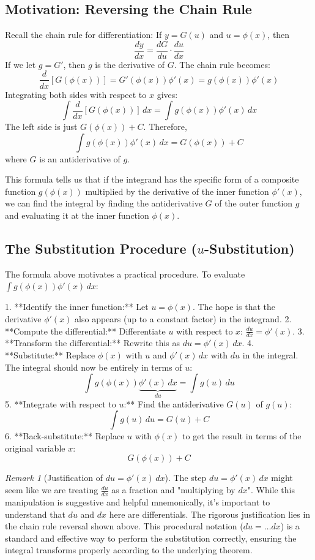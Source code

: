 \documentclass[11pt]{article}
\theoremstyle{definition}
\theoremstyle{remark}
\newtheorem{remark}[theorem]{Remark}
\begin{document}
\subsection{Motivation: Reversing the Chain Rule}
Recall the chain rule for differentiation: If $y = G(u)$ and $u = \phi(x)$, then
\[ \frac{dy}{dx} = \frac{dG}{du} \cdot \frac{du}{dx} \]
If we let $g = G'$, then $g$ is the derivative of $G$. The chain rule becomes:
\[ \frac{d}{dx} [G(\phi(x))] = G'(\phi(x)) \phi'(x) = g(\phi(x)) \phi'(x) \]
Integrating both sides with respect to $x$ gives:
\[ \int \frac{d}{dx} [G(\phi(x))] \, dx = \int g(\phi(x)) \phi'(x) \, dx \]
The left side is just $G(\phi(x)) + C$. Therefore,
\[ \int g(\phi(x)) \phi'(x) \, dx = G(\phi(x)) + C \]
where $G$ is an antiderivative of $g$.

This formula tells us that if the integrand has the specific form of a composite function $g(\phi(x))$ multiplied by the derivative of the inner function $\phi'(x)$, we can find the integral by finding the antiderivative $G$ of the outer function $g$ and evaluating it at the inner function $\phi(x)$.

\subsection{The Substitution Procedure (\texorpdfstring{$u$}{u}-Substitution)}
The formula above motivates a practical procedure. To evaluate $\int g(\phi(x)) \phi'(x) \, dx$:

1.  **Identify the inner function:** Let $u = \phi(x)$. The hope is that the derivative $\phi'(x)$ also appears (up to a constant factor) in the integrand.
2.  **Compute the differential:** Differentiate $u$ with respect to $x$: $\frac{du}{dx} = \phi'(x)$.
3.  **Transform the differential:** Rewrite this as $du = \phi'(x) \, dx$.
4.  **Substitute:** Replace $\phi(x)$ with $u$ and $\phi'(x) \, dx$ with $du$ in the integral. The integral should now be entirely in terms of $u$:
    \[ \int g(\phi(x)) \underbrace{\phi'(x) \, dx}_{du} = \int g(u) \, du \]
5.  **Integrate with respect to \texorpdfstring{$u$}{u}:** Find the antiderivative $G(u)$ of $g(u)$:
    \[ \int g(u) \, du = G(u) + C \]
6.  **Back-substitute:** Replace $u$ with $\phi(x)$ to get the result in terms of the original variable $x$:
    \[ G(\phi(x)) + C \]

\begin{remark}[Justification of $du = \phi'(x) \, dx$]
The step $du = \phi'(x) \, dx$ might seem like we are treating $\frac{du}{dx}$ as a fraction and "multiplying by $dx$". While this manipulation is suggestive and helpful mnemonically, it's important to understand that $du$ and $dx$ here are differentials. The rigorous justification lies in the chain rule reversal shown above. This procedural notation ($du = \dots dx$) is a standard and effective way to perform the substitution correctly, ensuring the integral transforms properly according to the underlying theorem.
\end{remark}
\end{document}
